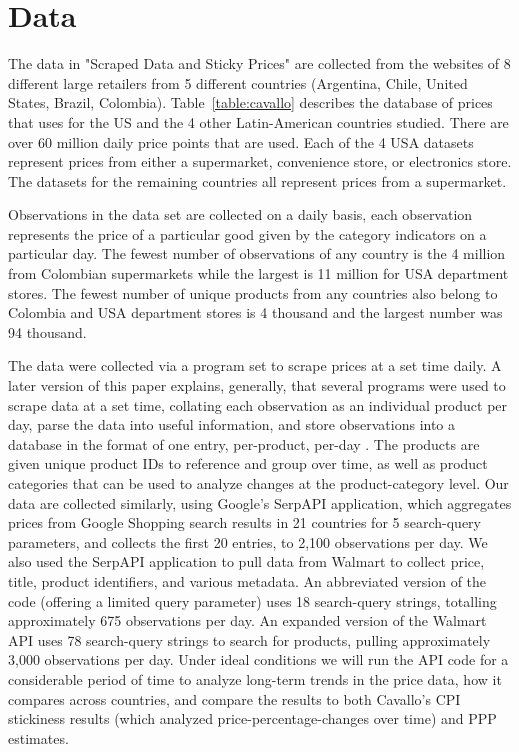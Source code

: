 \section{Data}
\label{data}

The data in "Scraped Data and Sticky Prices" \citep{Cavallo2015} are collected from the websites of 8 different large retailers from 5 different countries (Argentina, Chile, United States, Brazil, Colombia). Table~\ref{table:cavallo} describes the database of prices that \citet{Cavallo2015} uses for the US and the 4 other Latin-American countries studied. There are over 60 million daily price points that are used. Each of the 4 USA datasets represent prices from either a supermarket, convenience store, or electronics store. The datasets for the remaining countries all represent prices from a supermarket.  

Observations in the data set are collected on a daily basis, each observation represents the price of a particular good given by the category indicators on a particular day. The fewest number of observations of any country is the 4 million from Colombian supermarkets while the largest is 11 million for USA department stores. The fewest number of unique products from any countries also belong to Colombia and USA department stores is 4 thousand and the largest number was 94 thousand.

The \citet{Cavallo2015} data were collected via a program set to scrape prices at a set time daily.  A later version of this paper explains, generally, that several programs were used to scrape data at a set time, collating each observation as an individual product per day, parse the data into useful information, and store observations into a database in the format of one entry, per-product, per-day \citep{Cavallo2015}.  The products are given unique product IDs to reference and group over time, as well as product categories that can be used to analyze changes at the product-category level.  Our data are collected similarly, using Google's SerpAPI application, which aggregates prices from Google Shopping search results in 21 countries for 5 search-query parameters, and collects the first 20 entries, to 2,100 observations per day.  We also used the SerpAPI application to pull data from Walmart to collect price, title, product identifiers, and various metadata.  An abbreviated version of the code (offering a limited query parameter) uses 18 search-query strings, totalling approximately 675 observations per day.  An expanded version of the Walmart API uses 78 search-query strings to search for products, pulling approximately 3,000 observations per day.  Under ideal conditions we will run the API code for a considerable period of time to analyze long-term trends in the price data, how it compares across countries, and compare the results to both Cavallo's CPI stickiness results (which analyzed price-percentage-changes over time) and PPP estimates.


